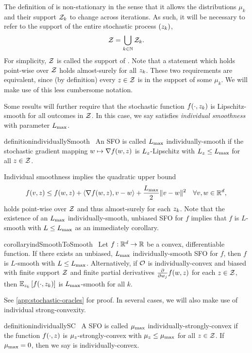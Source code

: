 The definition of \oracle{} is non-stationary in the sense that it allows the distributions \( \mu_k \) and their support \( \calZ_k \) to change across iterations.
As such, it will be necessary to refer to the support of the entire stochastic process \( \seq{\zk} \), 
\[ \calZ = \bigcup_{k\in \bbN} \calZ_k. \]
For simplicity, \( \calZ \) is called the support of \oracle{}. 
Note that a statement which holds point-wise over \( \calZ \) holds almost-surely for all \( \zk \).
These two requirements are equivalent, since (by definition) every \( \z \in \calZ \) is in the support of some \( \mu_k \).
We will make use of this less cumbersome notation. 

Some results will further require that the stochastic function \( f(\cdot, \zk) \) is Lipschitz-smooth for all outcomes in \( \calZ \).
In this case, we say \oracle{} satisfies \emph{individual smoothness} with parameter \( \Lmax \).
\begin{restatable}{definition}{individuallySmooth}~\label{def:individually-smooth}
    An \ac{SFO} \oracle{} is called \( \Lmax \) individually-smooth if the stochastic gradient mapping \( \w \mapsto \grad(\w, \z) \) is \( L_{\z} \)-Lipschitz with \( L_{\z} \leq \Lmax \) for all \( \z \in \calZ \).
\end{restatable}
\noindent Individual smoothness implies the quadratic upper bound
\[ f(v, \z) \leq f(\w, \z) + \abr{\grad(\w, \z), v - \w} + \frac{\Lmax}{2}\norm{v - \w}^2 \quad \forall v, \w \in \R^d, \]
holds point-wise over \( \calZ \) and thus almost-surely for each \( \zk \).
Note that the existence of an \( \Lmax \) individually-smooth, unbiased \ac{SFO} for \( f \) implies that \( f \) is \( L \)-smooth with \( L \leq \Lmax \) as an immediately corollary.
\begin{restatable}{corollary}{indSmoothToSmooth}~\label{cor:ind-smooth-to-smooth}
    Let \( f : \R^d \rightarrow \R \) be a convex, differentiable function.  
    If there exists an unbiased, \( \Lmax \) individually-smooth \ac{SFO} \oracle{} for \( f \), then \( f \) is \( L \)-smooth with \( L \leq \Lmax \).
    Alternatively, if \( \oracle{} \) is individually-convex and biased with finite support \( \calZ \) and finite partial derivatives \( \frac{\partial}{\partial w_j} f(\w, \z) \) for each \( z \in \calZ \), then \( \Ek \sbr{f(\cdot, \zk)} \) is \( \Lmax \)-smooth for all \( k \). 
\end{restatable}
\noindent See \autoref{app:stochastic-oracles} for proof. 
In several cases, we will also make use of individual strong-convexity.
\begin{restatable}{definition}{individuallySC}~\label{def:individually-sc}
    A \ac{SFO} \oracle{} is called \( \mumax \) individually-strongly-convex if the function \( f(\cdot, \z) \) is \( \mu_{\z} \)-strongly-convex with \( \mu_{\z} \leq \mumax \) for all \( \z \in \calZ \).
    If \( \mumax = 0 \), then we say \oracle{} is individually-convex.
\end{restatable}

